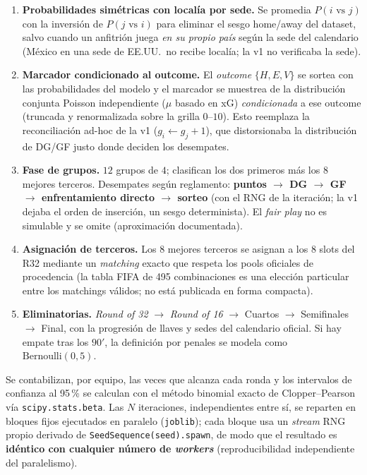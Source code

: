\documentclass[conference]{IEEEtran}
\begin{document}
\begin{enumerate}
  \item \textbf{Probabilidades sim\'etricas con localía por sede.} Se
        promedia $P(i\text{ vs }j)$ con la inversi\'on de
        $P(j\text{ vs }i)$ para eliminar el sesgo home/away del dataset,
        salvo cuando un anfitri\'on juega \emph{en su propio pa\'is}
        seg\'un la sede del calendario (M\'exico en una sede de EE.UU.\
        no recibe localía; la v1 no verificaba la sede).
  \item \textbf{Marcador condicionado al outcome.} El \emph{outcome}
        $\{H,E,V\}$ se sortea con las probabilidades del modelo y el
        marcador se muestrea de la distribuci\'on conjunta Poisson
        independiente ($\mu$ basado en xG) \emph{condicionada} a ese
        outcome (truncada y renormalizada sobre la grilla $0$--$10$).
        Esto reemplaza la reconciliaci\'on ad-hoc de la v1
        ($g_i \leftarrow g_j{+}1$), que distorsionaba la distribuci\'on
        de DG/GF justo donde deciden los desempates.
  \item \textbf{Fase de grupos.} $12$ grupos de $4$; clasifican los dos
        primeros m\'as los $8$ mejores terceros. Desempates seg\'un
        reglamento: \textbf{puntos $\to$ DG $\to$ GF $\to$ enfrentamiento
        directo $\to$ sorteo} (con el RNG de la iteraci\'on; la v1 dejaba
        el orden de inserci\'on, un sesgo determinista). El \emph{fair
        play} no es simulable y se omite (aproximaci\'on documentada).
  \item \textbf{Asignaci\'on de terceros.} Los 8 mejores terceros se
        asignan a los 8 slots del R32 mediante un \emph{matching} exacto
        que respeta los pools oficiales de procedencia (la tabla FIFA de
        495 combinaciones es una elecci\'on particular entre los
        matchings v\'alidos; no est\'a publicada en forma compacta).
  \item \textbf{Eliminatorias.} \emph{Round of 32} $\to$ \emph{Round of
        16} $\to$ Cuartos $\to$ Semifinales $\to$ Final, con la
        progresi\'on de llaves y sedes del calendario oficial. Si hay
        empate tras los $90'$, la definici\'on por penales se modela como
        $\text{Bernoulli}(0{,}5)$.
\end{enumerate}

Se contabilizan, por equipo, las veces que alcanza cada ronda y los
intervalos de confianza al 95\,\% se calculan con el m\'etodo binomial
exacto de Clopper--Pearson \cite{clopper1934} v\'ia
\texttt{scipy.stats.beta}. Las $N$ iteraciones, independientes entre s\'i, se
reparten en bloques fijos ejecutados en paralelo (\texttt{joblib}); cada bloque
usa un \emph{stream} RNG propio derivado de
\texttt{SeedSequence(seed).spawn}, de modo que el resultado es \textbf{id\'entico
  con cualquier n\'umero de \emph{workers}} (reproducibilidad independiente del
paralelismo).
\end{document}
